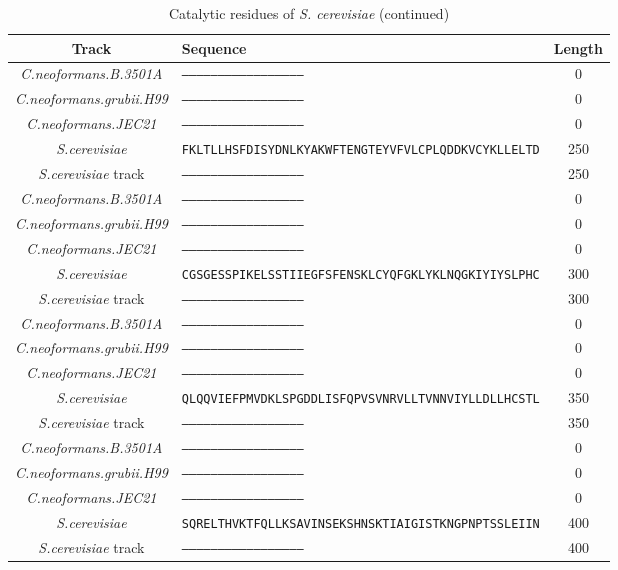 \begin{table}[htp]\footnotesize
\begin{tabular}{|c|l|c|} \hline
\textbf{Track} & \textbf{Sequence} & \textbf{Length}\\ \hline
\textit{C.neoformans.B.3501A} & \texttt{--------------------------------------------------} & 0
\\
\textit{C.neoformans.grubii.H99} & \texttt{--------------------------------------------------} & 0
\\
\textit{C.neoformans.JEC21} & \texttt{--------------------------------------------------} & 0
\\
\textit{S.cerevisiae} & \texttt{FKLTLLHSFDISYDNLKYAKWFTENGTEYVFVLCPLQDDKVCYKLLELTD} & 250
\\
\textit{S.cerevisiae} track & \texttt{--------------------------------------------------} & 250
\\
\hline
\textit{C.neoformans.B.3501A} & \texttt{--------------------------------------------------} & 0
\\
\textit{C.neoformans.grubii.H99} & \texttt{--------------------------------------------------} & 0
\\
\textit{C.neoformans.JEC21} & \texttt{--------------------------------------------------} & 0
\\
\textit{S.cerevisiae} & \texttt{CGSGESSPIKELSSTIIEGFSFENSKLCYQFGKLYKLNQGKIYIYSLPHC} & 300
\\
\textit{S.cerevisiae} track & \texttt{--------------------------------------------------} & 300
\\
\hline
\textit{C.neoformans.B.3501A} & \texttt{--------------------------------------------------} & 0
\\
\textit{C.neoformans.grubii.H99} & \texttt{--------------------------------------------------} & 0
\\
\textit{C.neoformans.JEC21} & \texttt{--------------------------------------------------} & 0
\\
\textit{S.cerevisiae} & \texttt{QLQQVIEFPMVDKLSPGDDLISFQPVSVNRVLLTVNNVIYLLDLLHCSTL} & 350
\\
\textit{S.cerevisiae} track & \texttt{--------------------------------------------------} & 350
\\
\hline
\textit{C.neoformans.B.3501A} & \texttt{--------------------------------------------------} & 0
\\
\textit{C.neoformans.grubii.H99} & \texttt{--------------------------------------------------} & 0
\\
\textit{C.neoformans.JEC21} & \texttt{--------------------------------------------------} & 0
\\
\textit{S.cerevisiae} & \texttt{SQRELTHVKTFQLLKSAVINSEKSHNSKTIAIGISTKNGPNPTSSLEIIN} & 400
\\
\textit{S.cerevisiae} track & \texttt{--------------------------------------------------} & 400
\\
\hline
\end{tabular}
\caption{Catalytic residues of \textit{S. cerevisiae} (continued)}
\label{tab:active1}
\end{table} \FloatBarrier

